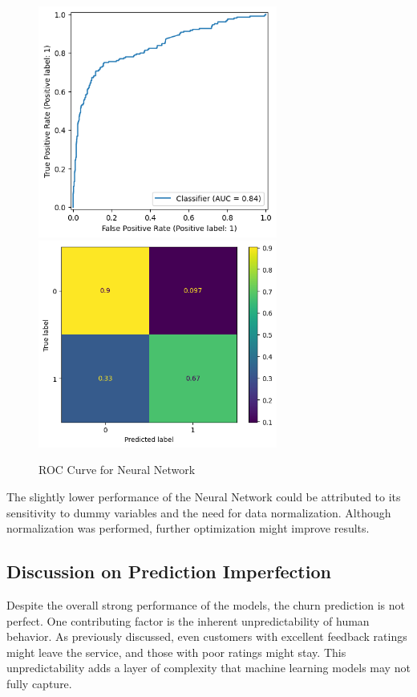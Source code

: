 \documentclass[12pt]{article}
\begin{document}
\begin{figure}[h!]
    \centering
    \includegraphics[width=0.7\textwidth]{figures/roc_curve_nn.png}
    \includegraphics[width=0.7\textwidth]{figures/confusion_matrix_nn.png}
    \caption{ROC Curve for Neural Network}
    \label{fig:roc_curve_nn}
\end{figure}

The slightly lower performance of the Neural Network could be attributed to its sensitivity to dummy variables and the need for data normalization. Although normalization was performed, further optimization might improve results.

\subsection{Discussion on Prediction Imperfection}
Despite the overall strong performance of the models, the churn prediction is not perfect. One contributing factor is the inherent unpredictability of human behavior. As previously discussed, even customers with excellent feedback ratings might leave the service, and those with poor ratings might stay. This unpredictability adds a layer of complexity that machine learning models may not fully capture.
\end{document}
